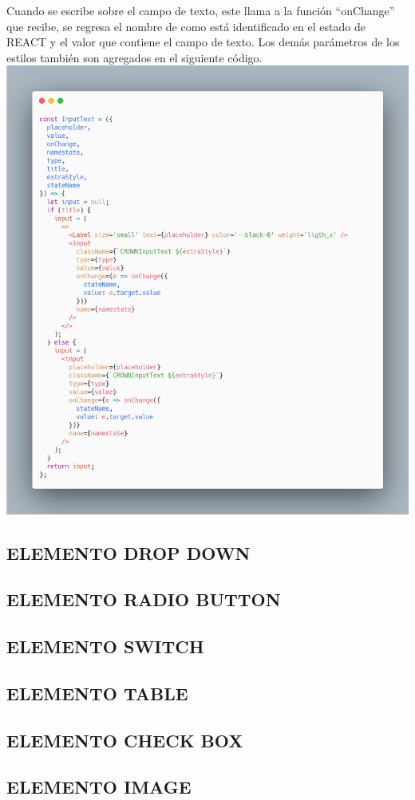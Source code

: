Cuando se escribe sobre el campo de texto, este llama a la función “onChange” que recibe, se regresa el nombre de como está identificado en el estado de REACT y el valor que contiene el campo de texto.
Los demás parámetros de los estilos también son agregados en el siguiente código.
\newline
\newline
\includegraphics[width=1\textwidth]{./Imagenes/carbon-12.png}
\newline
\newline



\subsection{ELEMENTO DROP DOWN}
\subsection{ELEMENTO RADIO BUTTON}
\subsection{ELEMENTO SWITCH}
\subsection{ELEMENTO TABLE}
\subsection{ELEMENTO CHECK BOX}
\subsection{ELEMENTO IMAGE}

